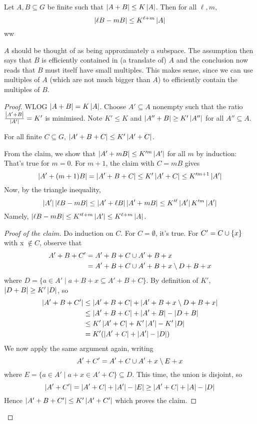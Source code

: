 \documentclass{article}
\begin{document}
\begin{thm}
  Let $A, B \subseteq G$ be finite such that $\left\lvert A + B\right\rvert \le K\left\lvert A\right\rvert$. Then for all $\ell, m$,
  $$\left\lvert \ell B - mB\right\rvert \le K^{\ell + m}\left\lvert A\right\rvert$$ww
\end{thm}
\begin{idea}
  $A$ should be thought of as being approximately a subspace. The assumption then says that $B$ is efficiently contained in (a translate of) $A$ and the conclusion now reads that $B$ must itself have small multiples. This makes sense, since we can use multiples of $A$ (which are not much bigger than $A$) to efficiently contain the multiples of $B$.
\end{idea}
\begin{proof}
  WLOG $\left\lvert A + B\right\rvert = K\left\lvert A\right\rvert$. Choose $A' \subseteq A$ nonempty such that the ratio $\frac{\left\lvert A' + B\right\rvert}{\left\lvert A'\right\rvert} = K'$ is minimised. Note $K' \le K$ and $\left\lvert A'' + B\right\rvert \ge K'\left\lvert A''\right\rvert$ for all $A'' \subseteq A$.
  \begin{claim}
    For all finite $C \subseteq G$, $\left\lvert A' + B + C\right\rvert \le K'\left\lvert A' + C\right\rvert$.
  \end{claim}
  From the claim, we show that $\left\lvert A' + mB\right\rvert \le K'^m\left\lvert A'\right\rvert$ for all $m$ by induction:
  That's true for $m = 0$. For $m + 1$, the claim with $C = mB$ gives
  $$\left\lvert A' + (m + 1)B\right\rvert = \left\lvert A' + B + C\right\rvert \le K'\left\lvert A' + C\right\rvert \le K'^{m + 1}\left\lvert A'\right\rvert$$
  Now, by the triangle inequality,
  $$\left\lvert A'\right\rvert\left\lvert \ell B - mB\right\rvert \le \left\lvert A' + \ell B\right\rvert\left\lvert A' + mB\right\rvert \le K'^\ell \left\lvert A'\right\rvert K'^m \left\lvert A'\right\rvert$$
  Namely, $\left\lvert \ell B - mB\right\rvert \le K'^{\ell + m}\left\lvert A'\right\rvert \le K^{\ell + m} \left\lvert A\right\rvert$.
  \begin{proof}[Proof of the claim]
    Do induction on $C$. For $C = \emptyset$, it's true. For $C' = C \cup \{x\}$ with x $\notin C$, observe that
    \begin{align*}
      A' + B + C'
      & = A' + B + C \cup A' + B + x \\
      & = A' + B + C \cup A' + B + x \setminus D + B + x
    \end{align*}
    where $D = \{a \in A' \mid a + B + x \subseteq A' + B + C\}$. By definition of $K'$, $\left\lvert D + B\right\rvert \ge K'\left\lvert D\right\rvert$, so
    \begin{align*}
      \left\lvert A' + B + C'\right\rvert
      & \le \left\lvert A' + B + C\right\rvert + \left\lvert A' + B + x \setminus D + B + x\right\rvert \\
      & \le \left\lvert A' + B + C\right\rvert + \left\lvert A' + B\right\rvert - \left\lvert D + B\right\rvert \\
      & \le K'\left\lvert A' + C\right\rvert + K'\left\lvert A'\right\rvert - K'\left\lvert D\right\rvert \\
      & = K'(\left\lvert A' + C\right\rvert + \left\lvert A'\right\rvert - \left\lvert D\right\rvert)
    \end{align*}
    We now apply the same argument again, writing
    $$A' + C' = A' + C \cup A' + x \setminus E + x$$
    where $E = \{a \in A' \mid a + x \in A' + C\} \subseteq D$. This time, the union is disjoint, so
    $$\left\lvert A '+ C'\right\rvert = \left\lvert A' + C\right\rvert + \left\lvert A'\right\rvert - \left\lvert E\right\rvert \ge \left\lvert A' + C\right\rvert + \left\lvert A\right\rvert - \left\lvert D\right\rvert$$
    Hence $\left\lvert A' + B + C'\right\rvert \le K'\left\lvert A' + C'\right\rvert$ which proves the claim.
  \end{proof}
\end{proof}
\end{document}
